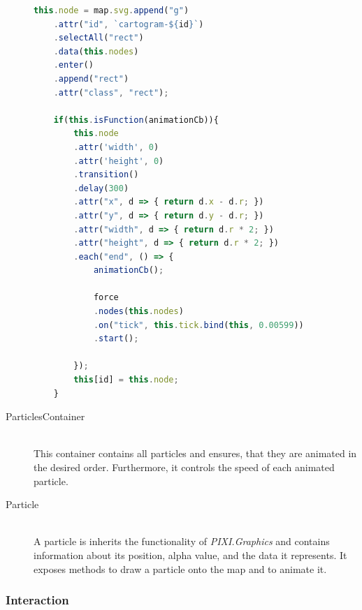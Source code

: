 \begin{description}
\begin{lstlisting}[language=JavaScript, caption={A small part of the draw-function of the pseudo Demers Cartogramm-class}, label={lst:cartogram-part-draw}]
    this.node = map.svg.append("g")
    .attr("id", `cartogram-${id}`)
    .selectAll("rect")
    .data(this.nodes)
    .enter()
    .append("rect")
    .attr("class", "rect");

    if(this.isFunction(animationCb)){
        this.node
        .attr('width', 0)
        .attr('height', 0)
        .transition()
        .delay(300)
        .attr("x", d => { return d.x - d.r; })
        .attr("y", d => { return d.y - d.r; })
        .attr("width", d => { return d.r * 2; })
        .attr("height", d => { return d.r * 2; })
        .each("end", () => {
            animationCb();

            force
            .nodes(this.nodes)
            .on("tick", this.tick.bind(this, 0.00599))
            .start();

        });
        this[id] = this.node;
    }
\end{lstlisting}

\item[ParticlesContainer] \hfill \\
This container contains all particles and ensures, that they are animated in the desired order. Furthermore, it controls the speed of each animated particle.

\item[Particle] \hfill \\
A particle is inherits the functionality of \textit{PIXI.Graphics} and contains information about its position, alpha value, and the data it represents. It exposes methods to draw a particle onto the map and to animate it.

\end{description}


\subsubsection{Interaction}
